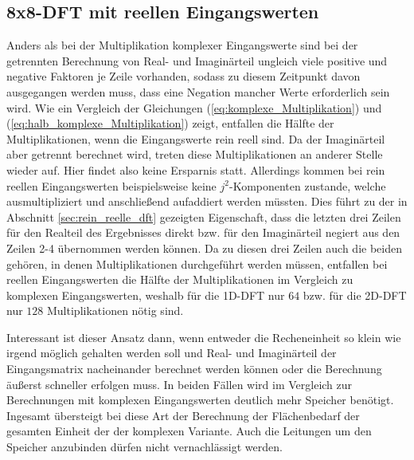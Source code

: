 \subsection{8x8-DFT mit reellen Eingangswerten}\label{sec:RelleEingangswerte}
Anders als bei der Multiplikation komplexer Eingangswerte sind bei der getrennten Berechnung von Real- und Imaginärteil ungleich viele positive 
und negative Faktoren je Zeile vorhanden, sodass zu diesem Zeitpunkt davon ausgegangen werden muss, dass eine Negation mancher Werte erforderlich sein wird. 
Wie ein Vergleich der Gleichungen (\ref{eq:komplexe_Multiplikation}) und (\ref{eq:halb_komplexe_Multiplikation}) zeigt, entfallen die Hälfte der Multiplikationen, wenn die
Eingangswerte rein reell sind. Da der Imaginärteil aber getrennt berechnet wird, treten diese Multiplikationen an anderer Stelle wieder auf. Hier findet also keine
Ersparnis statt.
Allerdings kommen bei rein reellen Eingangswerten beispielsweise keine $j^2$-Komponenten zustande, welche ausmultipliziert und anschließend aufaddiert werden müssten. 
Dies führt zu der in Abschnitt \ref{sec:rein_reelle_dft} gezeigten Eigenschaft, dass die letzten drei Zeilen für den Realteil des Ergebnisses direkt bzw. für den Imaginärteil 
negiert aus den Zeilen 2-4 übernommen werden können. 
Da zu diesen drei Zeilen auch die beiden gehören, in denen Multiplikationen durchgeführt werden müssen, entfallen bei reellen Eingangswerten die Hälfte der Multiplikationen im 
Vergleich zu komplexen Eingangswerten, weshalb für die 1D-DFT nur $64$ bzw. für die 2D-DFT nur $128$ Multiplikationen nötig sind.

Interessant ist dieser Ansatz dann, wenn entweder die Recheneinheit so klein wie irgend möglich gehalten werden soll und Real- und Imaginärteil der Eingangsmatrix nacheinander
berechnet werden können oder die Berechnung äußerst schneller erfolgen muss. In beiden Fällen wird im Vergleich zur Berechnungen mit komplexen Eingangswerten deutlich mehr
Speicher benötigt.
Ingesamt übersteigt bei diese Art der Berechnung der Flächenbedarf der gesamten Einheit der der komplexen Variante. Auch die Leitungen um den Speicher anzubinden dürfen 
nicht vernachlässigt werden.



